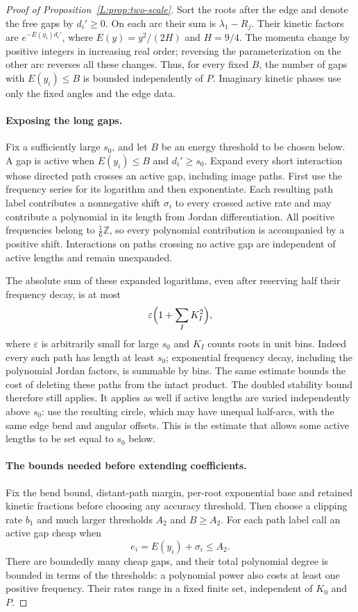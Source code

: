 \documentclass[11pt]{article}
\numberwithin{equation}{section}
\theoremstyle{definition}\newtheorem{definition}[theorem]{Definition}
\theoremstyle{remark}\newtheorem{remark}[theorem]{Remark}
\begin{document}
\begin{proof}[Proof of Proposition~\ref{L:prop:two-scale}]
Sort the roots after the edge and denote the free gaps by $d_i'\ge0$.
On each arc their sum is $\lambda_1-R_j$. Their kinetic factors are
$e^{-E(y_i)d_i'}$, where $E(y)=y^2/(2H)$ and $H=9/4$. The momenta
change by positive integers in increasing real order; reversing the
parameterization on the other arc reverses all these changes. Thus,
for every fixed $B$, the number of gaps with $E(y_i)\le B$ is bounded
independently of $P$. Imaginary kinetic phases use only the fixed
angles and the edge data.

\paragraph{Exposing the long gaps.}
Fix a sufficiently large $s_0$, and let $B$ be an energy threshold to
be chosen below. A gap is active when
$E(y_i)\le B$ and $d_i'\ge s_0$. Expand every short interaction whose
directed path crosses an active gap, including image paths. First use
the frequency series for its logarithm and then exponentiate. Each
resulting path label contributes a nonnegative shift $\sigma_i$ to
 every crossed active rate and may contribute a polynomial in its
length from Jordan differentiation. All positive frequencies belong
to $\tfrac16\mathbb Z$, so every polynomial contribution is accompanied
by a positive shift. Interactions on paths crossing no active gap are
independent of active lengths and remain unexpanded.

The absolute sum of these expanded logarithms, even after reserving
half their frequency decay, is at most
\[
       \varepsilon\Bigl(1+\sum_I K_I^2\Bigr),
\]
where $\varepsilon$ is arbitrarily small for large $s_0$ and $K_I$
counts roots in unit bins. Indeed every such path has length at least
$s_0$; exponential frequency decay, including the polynomial Jordan
factors, is summable by bins. The same estimate bounds the cost of
deleting these paths from the intact product. The doubled stability
bound therefore still applies. It applies as well if active lengths
are varied independently above $s_0$: use the resulting circle, which
may have unequal half-arcs, with the same edge bend and angular
offsets. This is the estimate that allows some active lengths to be
set equal to $s_0$ below.

\paragraph{The bounds needed before extending coefficients.}
Fix the bend bound, distant-path margin, per-root exponential base and
retained kinetic fractions before choosing any accuracy threshold.
Then choose a clipping rate $b_1$ and much larger thresholds $A_2$ and
$B\ge A_2$. For each path label call an active gap cheap when
\[
                  e_i=E(y_i)+\sigma_i\le A_2.
\]
There are boundedly many cheap gaps, and their total polynomial degree
is bounded in terms of the thresholds: a polynomial power also costs
at least one positive frequency. Their rates range in a fixed finite
set, independent of $K_0$ and $P$.


\end{proof}
\end{document}

